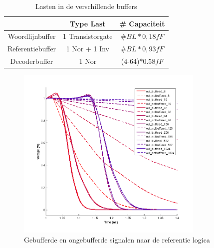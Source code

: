 \begin{table}
\begin{center}
\begin{tabular}{ccc}
\hline
 & Type Last & \# Capaciteit\\
\hline
Woordlijnbuffer & 1 Transistorgate &  $\#BL*0,18fF$\\
Referentiebuffer & 1 Nor + 1 Inv &  $\#BL*0,93fF$\\
Decoderbuffer & 1 Nor & (4-64)$*0.58fF$\\
\hline
\end{tabular}
\end{center}
\caption[Lasten in de verschillende buffers]{Lasten in de verschillende buffers}
\label{tab:buffer}
\end{table}

\begin{figure}[!ht]
  \centering
  \includegraphics[width=0.8\textwidth]{../fig/hfdst-buffers-refbuffer.png}
  \caption[Gebufferde en ongebufferde signalen naar de referentie logica]{Gebufferde en ongebufferde signalen naar de referentie logica}
  \label{fig:refbuffer}
\end{figure}

